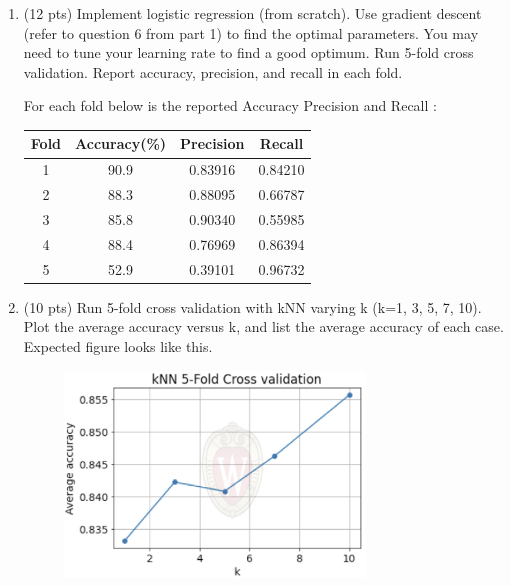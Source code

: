 \documentclass[a4paper]{article}
\theoremstyle{definition}
\newenvironment{soln}{
    \leavevmode\color{blue}\ignorespaces
}{}
\begin{document}
\begin{enumerate}
\begin{soln}
 
 
        \end{soln}
	
	\item (12 pts) Implement logistic regression (from scratch). Use gradient descent (refer to question 6 from part 1) to find the optimal parameters. You may need to tune your learning rate to find a good optimum. Run 5-fold cross validation. Report accuracy, precision, and recall in each fold.
	
	\begin{soln}  For each fold below is the reported Accuracy                     Precision and Recall : \\
            \begin{center}
            \begin{tabular}{ c  c  c  c}
            \hline
            Fold & Accuracy(\%) & Precision & Recall \\ \hline
            1 & 90.9 & 0.83916 & 0.84210 \\
            2 & 88.3 & 0.88095 & 0.66787 \\
            3 & 85.8 &  0.90340 & 0.55985 \\
            4 & 88.4 & 0.76969 & 0.86394\\
            5 & 52.9 & 0.39101 & 0.96732 \\
            \hline
            \end{tabular}
            \end{center} \end{soln}
	
	\item (10 pts) Run 5-fold cross validation with kNN varying k (k=1, 3, 5, 7, 10). Plot the average accuracy versus k, and list the average accuracy of each case. \\
	Expected figure looks like this.
	\begin{figure}[h]
		\centering
		\includegraphics[width=8cm]{knn.png}
	\end{figure}\\
	

\end{enumerate}
\end{document}
